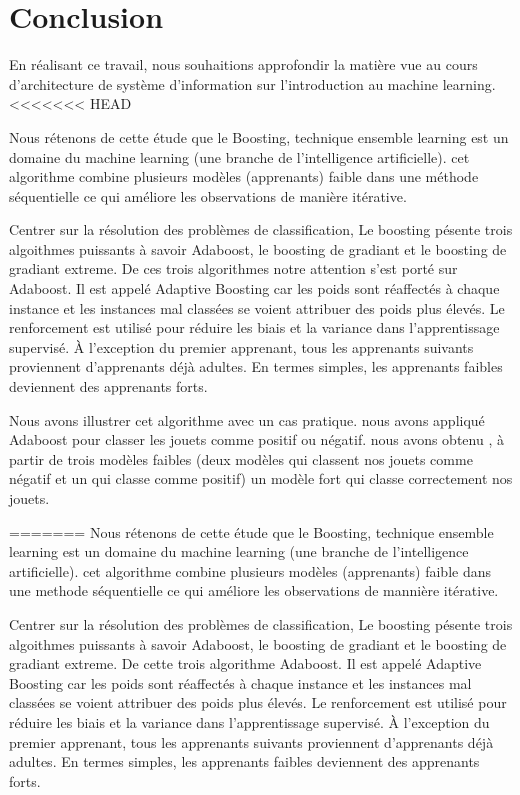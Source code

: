 \documentclass[french,a4paper,12pt]{article}
\begin{document}
\newpage
\section{Conclusion}
\quad En réalisant ce travail, nous souhaitions approfondir la matière vue au cours d'architecture de système d'information sur l'introduction au machine learning.
<<<<<<< HEAD


\quad  Nous rétenons de cette étude que le Boosting,  technique ensemble learning  est un domaine du machine learning (une branche de l'intelligence artificielle). cet algorithme combine plusieurs modèles (apprenants) faible dans une méthode séquentielle ce qui améliore les observations de manière itérative.

\quad Centrer sur la résolution des problèmes de classification, Le boosting pésente trois algoithmes puissants à savoir Adaboost, le boosting de gradiant et le boosting de gradiant extreme. De ces trois algorithmes notre attention s'est porté sur  Adaboost. Il est appelé Adaptive Boosting car les poids sont réaffectés à chaque instance et les instances mal classées se voient attribuer des poids plus élevés. Le renforcement  est utilisé pour réduire les biais et la variance dans l'apprentissage supervisé. À l'exception du premier apprenant, tous les apprenants suivants proviennent d'apprenants déjà adultes. En termes simples, les apprenants faibles deviennent des apprenants forts.


\quad Nous avons illustrer cet algorithme avec un cas pratique. nous avons appliqué Adaboost pour classer les jouets comme positif ou négatif. nous avons obtenu , à partir de trois modèles faibles (deux modèles qui classent nos jouets comme négatif et un qui classe comme positif) un modèle fort qui classe correctement nos jouets.


=======
\quad  Nous rétenons de cette étude que le Boosting,  technique ensemble learning  est un domaine du machine learning (une branche de l'intelligence artificielle). cet algorithme combine plusieurs modèles (apprenants) faible dans une methode séquentielle ce qui améliore les observations de mannière itérative.

\quad Centrer sur la résolution des problèmes de classification, Le boosting pésente trois algoithmes puissants à savoir Adaboost, le boosting de gradiant et le boosting de gradiant extreme. De cette trois algorithme Adaboost. Il est appelé Adaptive Boosting car les poids sont réaffectés à chaque instance et les instances mal classées se voient attribuer des poids plus élevés. Le renforcement  est utilisé pour réduire les biais et la variance dans l'apprentissage supervisé. À l'exception du premier apprenant, tous les apprenants suivants proviennent d'apprenants déjà adultes. En termes simples, les apprenants faibles deviennent des apprenants forts.
\end{document}
